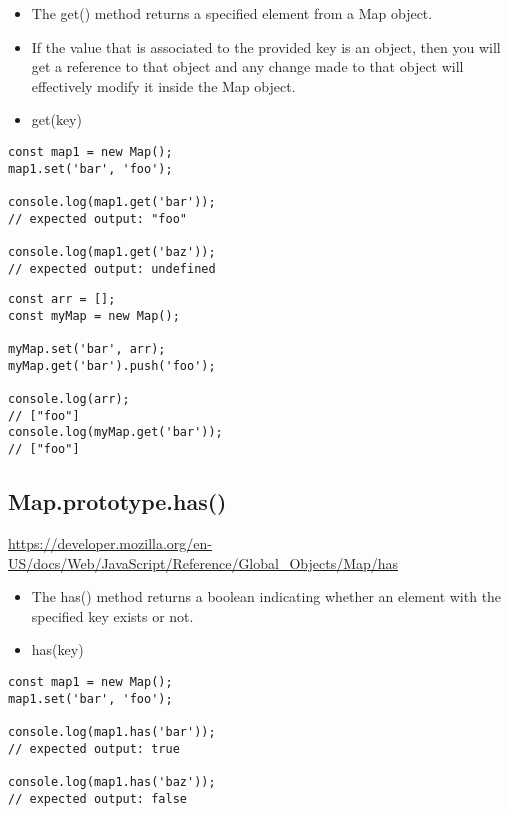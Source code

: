 \documentclass[10pt]{article}
\begin{document}
\begin{itemize}
	\item The get() method returns a specified element from a Map object. 
	\item If the value that is associated to the provided key is an object, then you will get a reference to that object and any change made to that object will effectively modify it inside the Map object.
	\item get(key)
\end{itemize}

\begin{lstlisting}[title=Example Map.prototype.get(), captionpos=t]
const map1 = new Map();
map1.set('bar', 'foo');

console.log(map1.get('bar'));
// expected output: "foo"

console.log(map1.get('baz'));
// expected output: undefined
\end{lstlisting}


\begin{lstlisting}[title=Example get(), captionpos=t]
const arr = [];
const myMap = new Map();

myMap.set('bar', arr);
myMap.get('bar').push('foo');

console.log(arr); 
// ["foo"]
console.log(myMap.get('bar')); 
// ["foo"]
\end{lstlisting}
\medskip %





\medskip %
\pagebreak
\subsection{Map.prototype.has()}

\url{https://developer.mozilla.org/en-US/docs/Web/JavaScript/Reference/Global_Objects/Map/has}

\begin{itemize}
	\item The has() method returns a boolean indicating whether an element with the specified key exists or not.
	\item has(key)

\end{itemize}

\begin{lstlisting}[title=Example Map.prototype.has(), captionpos=t]
const map1 = new Map();
map1.set('bar', 'foo');

console.log(map1.has('bar'));
// expected output: true

console.log(map1.has('baz'));
// expected output: false
\end{lstlisting}
\end{document}
